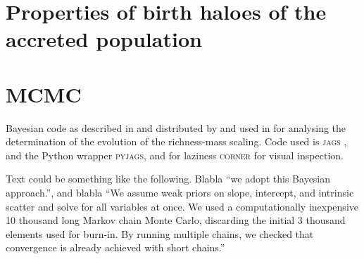 \documentclass[12pt, a4paper]{article}
\begin{document}
\clearpage

\clearpage

\section{Properties of birth haloes of the accreted population}
\label{sec:accreted-birth-haloes}


\appendix
\section{MCMC}
Bayesian  code  as  described  in  and  distributed  by \citet{2012A&A...547A.117A}
and used in \citet{2014A&A...568A..23A} for analysing the determination 
of the evolution of the richness-mass scaling. Code used is \textsc{jags} 
\citep{plummer2003jags}, and the Python wrapper \textsc{pyjags}, and
for laziness \textsc{corner} \citep{corner} for visual inspection.

Text could be something like the following.
Blabla ``we adopt this Bayesian approach.'', and blabla
``We assume weak priors on slope, intercept, and intrinsic scatter and solve for 
all variables at once. We used a computationally inexpensive 10 thousand long 
Markov chain Monte Carlo, discarding the initial 3 thousand elements used for 
burn-in. By running multiple chains, we checked that convergence is already 
achieved with short chains.''



\end{document}
